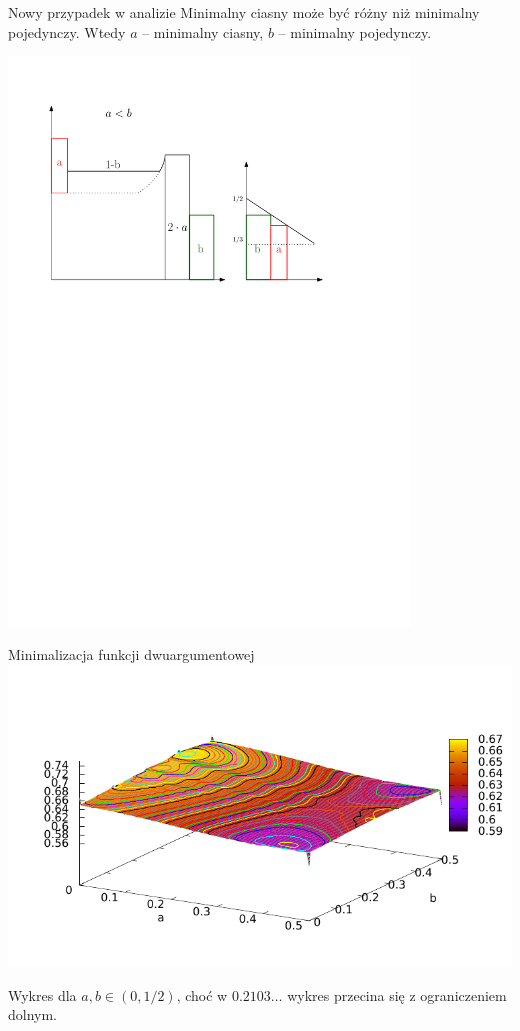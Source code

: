 \documentclass{beamer}
\begin{document}
\begin{frame}{Nowy przypadek w analizie}
  Minimalny ciasny może być różny niż minimalny pojedynczy. Wtedy $a$ -- minimalny ciasny, $b$ -- minimalny pojedynczy.
  
  \begin{center}
    \includegraphics[width=0.8\textwidth]{figs/twoarg}
  \end{center}
  
\end{frame}

\begin{frame}{Minimalizacja funkcji dwuargumentowej}
  \includegraphics{figs/plot_rotated.pdf}

  \vspace{-1cm}
  \small Wykres dla $a,b \in (0, 1/2)$, choć w $0.2103\ldots$ wykres przecina się z ograniczeniem dolnym.
\end{frame}
\end{document}

